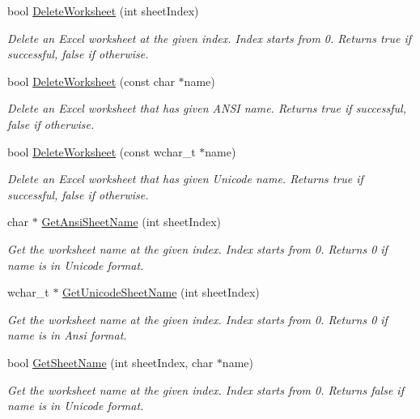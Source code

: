 \begin{DoxyCompactItemize}
bool \hyperlink{class_y_excel_1_1_basic_excel_af5113897cf4c4326e1ad14e38f745ec1}{Delete\+Worksheet} (int sheet\+Index)
\begin{DoxyCompactList}\small\item\em Delete an Excel worksheet at the given index. Index starts from 0. Returns true if successful, false if otherwise. \end{DoxyCompactList}\item 
bool \hyperlink{class_y_excel_1_1_basic_excel_aada082cff09c5c7953a50fa0baef401a}{Delete\+Worksheet} (const char $\ast$name)
\begin{DoxyCompactList}\small\item\em Delete an Excel worksheet that has given A\+N\+S\+I name. Returns true if successful, false if otherwise. \end{DoxyCompactList}\item 
bool \hyperlink{class_y_excel_1_1_basic_excel_a1b9a7b19867acdece16040a2b1002120}{Delete\+Worksheet} (const wchar\+\_\+t $\ast$name)
\begin{DoxyCompactList}\small\item\em Delete an Excel worksheet that has given Unicode name. Returns true if successful, false if otherwise. \end{DoxyCompactList}\item 
char $\ast$ \hyperlink{class_y_excel_1_1_basic_excel_ab7215ce16981e8abae02a57359b6f9cb}{Get\+Ansi\+Sheet\+Name} (int sheet\+Index)
\begin{DoxyCompactList}\small\item\em Get the worksheet name at the given index. Index starts from 0. Returns 0 if name is in Unicode format. \end{DoxyCompactList}\item 
wchar\+\_\+t $\ast$ \hyperlink{class_y_excel_1_1_basic_excel_ac282483b8018ddd8dbf4cd755c158f02}{Get\+Unicode\+Sheet\+Name} (int sheet\+Index)
\begin{DoxyCompactList}\small\item\em Get the worksheet name at the given index. Index starts from 0. Returns 0 if name is in Ansi format. \end{DoxyCompactList}\item 
bool \hyperlink{class_y_excel_1_1_basic_excel_a8b81fcc702b7c656df90c57c7a04b4ac}{Get\+Sheet\+Name} (int sheet\+Index, char $\ast$name)
\begin{DoxyCompactList}\small\item\em Get the worksheet name at the given index. Index starts from 0. Returns false if name is in Unicode format. \end{DoxyCompactList}\item 

\end{DoxyCompactItemize}
